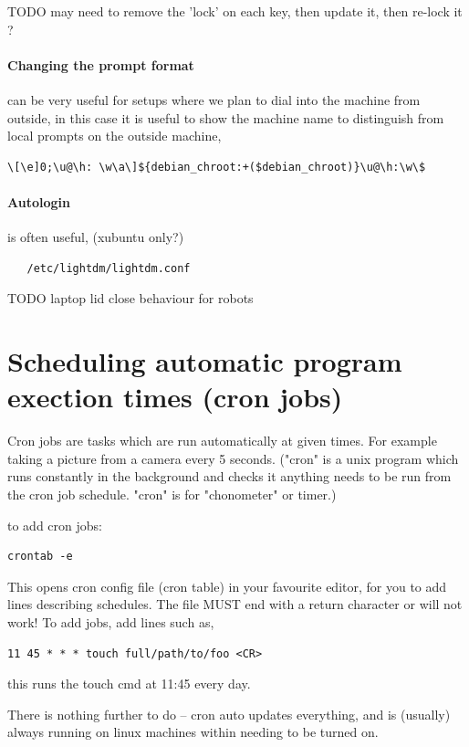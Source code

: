 \documentclass[oneside,english]{scrbook}
\begin{document}
TODO may need to remove the 'lock' on each key, then update it, then re-lock it ?

\paragraph{Changing the prompt format} can be very useful for setups where we plan to dial into the machine from outside, in this case it is useful to show the machine name to distinguish from local prompts on the outside machine,
\begin{lstlisting}
\[\e]0;\u@\h: \w\a\]${debian_chroot:+($debian_chroot)}\u@\h:\w\$
\end{lstlisting}

\paragraph{Autologin} is often useful, (xubuntu only?)
\begin{lstlisting}
   /etc/lightdm/lightdm.conf
\end{lstlisting}

TODO laptop lid close behaviour for robots

\section{Scheduling automatic program exection times (cron jobs)}

Cron jobs are tasks which are run automatically at given times.  For example taking a picture from a camera every 5 seconds.  ("cron" is a unix program which runs constantly in the background and checks it anything needs to be run from the cron job schedule. "cron" is for "chonometer" or timer.)

to add cron jobs:
\begin{lstlisting}
crontab -e     
\end{lstlisting}
This opens cron config file (cron table) in your favourite editor, for you to add lines describing schedules.  The file MUST end with a return character or will not work!  To add jobs, add lines such as,

\begin{lstlisting}
11 45 * * * touch full/path/to/foo <CR>
\end{lstlisting}
this runs the touch cmd at 11:45 every day.

There is nothing further to do -- cron auto updates everything, and is (usually) always running on linux machines within needing to be turned on.
\end{document}
